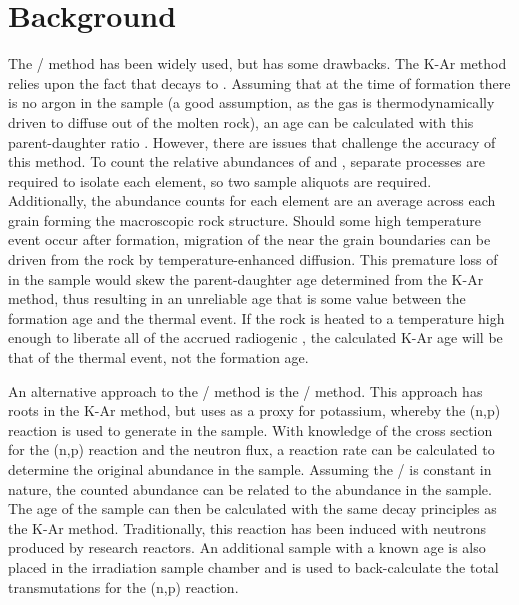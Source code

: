 \documentclass{mc2015}
\begin{document}
\section{Background}
The / method has been widely used, but has some drawbacks. The K-Ar method relies upon the fact that  decays to . Assuming that at the time of formation there is no argon in the sample (a good assumption, as the gas is thermodynamically driven to diffuse out of the molten rock), an age can be calculated with this parent-daughter ratio \cite{mcdougall_geochronology_1999}. However, there are issues that challenge the accuracy of this method. To count the relative abundances of  and , separate processes are required to isolate each element, so two sample aliquots are required. Additionally, the abundance counts for each element are an average across each grain forming the macroscopic rock structure. Should some high temperature event occur after formation, migration of the  near the grain boundaries can be driven from the rock by temperature-enhanced diffusion. This premature loss of  in the sample would skew the parent-daughter age determined from the K-Ar method, thus resulting in an unreliable age that is some value between the formation age and the thermal event. If the rock is heated to a temperature high enough to liberate all of the accrued radiogenic , the calculated K-Ar age will be that of the thermal event, not the formation age. 

An alternative approach to the / method is the / method. This approach has roots in the K-Ar method, but uses  as a proxy for potassium, whereby the (n,p) reaction is used to generate  in the sample. With knowledge of the cross section for the (n,p) reaction and the neutron flux, a reaction rate can be calculated to determine the original  abundance in the sample. Assuming the / is constant in nature, the counted  abundance can be related to the  abundance in the sample. The age of the sample can then be calculated with the same decay principles as the K-Ar method. Traditionally, this reaction has been induced with neutrons produced by research reactors. An additional sample with a known age is also placed in the irradiation sample chamber and is used to back-calculate the total transmutations for the (n,p) reaction. 
\end{document}
